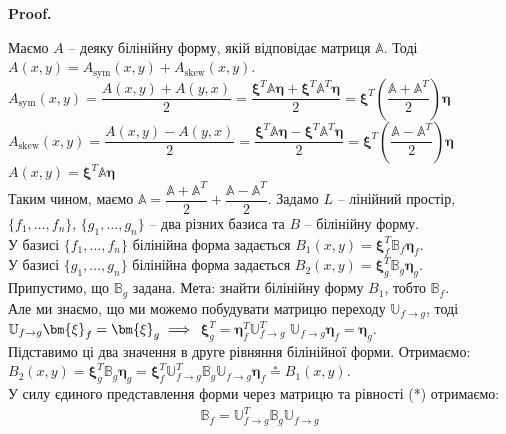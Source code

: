 \documentclass[a4paper, 10pt]{article}
\makeatletter
\theoremstyle{theoremdd}
\renewenvironment{proof}[1][Proof.\\]{\par
\pushQED{\hfill \qed}%
\normalfont \topsep6\p@\@plus6\p@\relax
\trivlist
\item\relax
{\bfseries
#1\@addpunct{.}}\hspace\labelsep\ignorespaces
}{%
\popQED\endtrivlist\@endpefalse
}
\makeatother
\begin{document}
\begin{proof}
Маємо $A$ -- деяку білінійну форму, якій відповідає матриця $\mathbb{A}$. Тоді $A(x,y) = A_{\text{sym}}(x,y) + A_{\text{skew}}(x,y)$.\\
$A_{\text{sym}}(x,y) = \dfrac{A(x,y) + A(y,x)}{2} = \dfrac{\bm{\xi}^T \mathbb{A} \bm{\eta} + \bm{\xi}^T \mathbb{A}^T \bm{\eta}}{2} = \bm{\xi}^T \left( \dfrac{\mathbb{A} + \mathbb{A}^T}{2} \right) \bm{\eta}$\\
$A_{\text{skew}}(x,y) = \dfrac{A(x,y) - A(y,x)}{2} = \dfrac{\bm{\xi}^T \mathbb{A} \bm{\eta} - \bm{\xi}^T \mathbb{A}^T \bm{\eta}}{2} = \bm{\xi}^T \left( \dfrac{\mathbb{A} - \mathbb{A}^T}{2} \right) \bm{\eta}$\\
$A(x,y) = \bm{\xi}^T \mathbb{A} \bm{\eta}$\\
Таким чином, маємо $\mathbb{A} = \dfrac{\mathbb{A} + \mathbb{A}^T}{2} + \dfrac{\mathbb{A} - \mathbb{A}^T}{2}$.
\end{proof}
\noindent
Задамо $L$ -- лінійний простір, $\{f_1,\dots,f_n\}$, $\{g_1,\dots,g_n\}$ -- два різних базиса та $B$ -- білінійну форму.\\
У базисі $\{f_1,\dots,f_n\}$ білінійна форма задається $B_1(x,y) = \bm{\xi}^T_f \mathbb{B}_f \bm{\eta}_f$.\\
У базисі $\{g_1,\dots,g_n\}$ білінійна форма задається $B_2(x,y) = \bm{\xi}^T_g \mathbb{B}_g \bm{\eta}_g$.\\
Припустимо, що $\mathbb{B}_g$ задана. Мета: знайти білінійну форму $B_1$, тобто $\mathbb{B}_f$.\\
Але ми знаємо, що ми можемо побудувати матрицю переходу $\mathbb{U}_{f \to g}$, тоді $\mathbb{U}_{f \to g} \bm{\xi}_f = \bm{\xi}_g \implies \\ $ 
$\bm{\xi}_g^T = \bm{\eta}_f^T \mathbb{U}_{f \to g}^T$ \qquad $\mathbb{U}_{f \to g} \bm{\eta}_f = \bm{\eta}_g$.\\
Підставимо ці два значення в друге рівняння білінійної форми. Отримаємо:\\
$B_2(x,y) = \bm{\xi}_g^T \mathbb{B}_g \bm{\eta}_g = \bm{\xi}_f^T \mathbb{U}^T_{f \to g} \mathbb{B}_g \mathbb{U}_{f \to g} \bm{\eta}_f \overset{*}{=} B_1(x,y)$.\\
У силу єдиного представлення форми через матрицю та рівності (*) отримаємо:
\begin{align*}
\mathbb{B}_f = \mathbb{U}^T_{f \to g} \mathbb{B}_g \mathbb{U}_{f \to g}
\end{align*}
\end{document}
